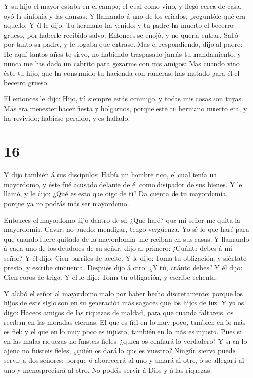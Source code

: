  Y su hijo el mayor estaba en el campo; el cual como vino,
y llegó cerca de casa, oyó la sinfonía y las danzas;  Y
llamando á uno de los criados, preguntóle qué era aquello. 
Y él le dijo: Tu hermano ha venido; y tu padre ha muerto el becerro
grueso, por haberle recibido salvo.  Entonces se enojó, y
no quería entrar. Salió por tanto su padre, y le rogaba que entrase.
 Mas él respondiendo, dijo al padre: He aquí tantos años te
sirvo, no habiendo traspasado jamás tu mandamiento, y nunca me has dado
un cabrito para gozarme con mis amigos:  Mas cuando vino
éste tu hijo, que ha consumido tu hacienda con rameras, has matado para
él el becerro grueso.

 El entonces le dijo: Hijo, tú siempre estás conmigo, y
todas mis cosas son tuyas.  Mas era menester hacer fiesta y
holgarnos, porque este tu hermano muerto era, y ha revivido; habíase
perdido, y es hallado.

\hypertarget{section-15}{%
\section{16}\label{section-15}}

 Y dijo también á sus discípulos: Había un hombre rico, el
cual tenía un mayordomo, y éste fué acusado delante de él como disipador
de sus bienes.  Y le llamó, y le dijo: ¿Qué es esto que oigo
de ti? Da cuenta de tu mayordomía, porque ya no podrás más ser
mayordomo.

 Entonces el mayordomo dijo dentro de sí: ¿Qué haré? que mi
señor me quita la mayordomía. Cavar, no puedo; mendigar, tengo
vergüenza.  Yo sé lo que haré para que cuando fuere quitado
de la mayordomía, me reciban en sus casas.  Y llamando á
cada uno de los deudores de su señor, dijo al primero: ¿Cuánto debes á
mi señor?  Y él dijo: Cien barriles de aceite. Y le dijo:
Toma tu obligación, y siéntate presto, y escribe cincuenta. 
Después dijo á otro: ¿Y tú, cuánto debes? Y él dijo: Cien coros de
trigo. Y él le dijo: Toma tu obligación, y escribe ochenta.

 Y alabó el señor al mayordomo malo por haber hecho
discretamente; porque los hijos de este siglo son en su generación más
sagaces que los hijos de luz.  Y yo os digo: Haceos amigos
de las riquezas de maldad, para que cuando faltareis, os reciban en las
moradas eternas.  El que es fiel en lo muy poco, también en
lo más es fiel: y el que en lo muy poco es injusto, también en lo más es
injusto.  Pues si en las malas riquezas no fuisteis fieles,
¿quién os confiará lo verdadero?  Y si en lo ajeno no
fuisteis fieles, ¿quién os dará lo que es vuestro?  Ningún
siervo puede servir á dos señores; porque ó aborrecerá al uno y amará al
otro, ó se allegará al uno y menospreciará al otro. No podéis servir á
Dios y á las riquezas.

